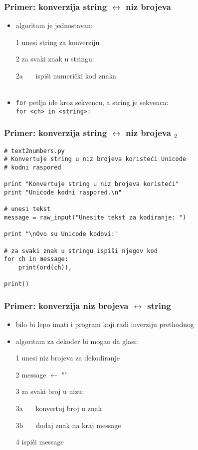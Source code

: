 \documentclass[utf8,compress]{beamer}
\begin{document}
\begin{frame}[fragile]
  \frametitle{Primer: konverzija string $\leftrightarrow$ niz brojeva}
  \begin{itemize}
    \item algoritam je jednostavan:
    \item[1] unesi string za konverziju
    \item[2] za svaki znak u stringu:
    \item[2a] \ \ \ ispiši numerički kod znaka \\ \ \\ %
    \item \texttt{for} petlja ide kroz sekvencu, a string je sekvenca: \\
      \texttt{for <ch> in <string>:}
  \end{itemize}
\end{frame}

\begin{frame}[fragile,shrink=10]
  \frametitle{Primer: konverzija string $\leftrightarrow$ niz brojeva $_2$}
\begin{verbatim}
# text2numbers.py
# Konvertuje string u niz brojeva koristeći Unicode
# kodni raspored

print "Konvertuje string u niz brojeva koristeći"
print "Unicode kodni raspored.\n"

# unesi tekst
message = raw_input("Unesite tekst za kodiranje: ")

print "\nOvo su Unicode kodovi:"

# za svaki znak u stringu ispiši njegov kod
for ch in message:
    print(ord(ch)),

print()
\end{verbatim}
\end{frame}

\begin{frame}[fragile]
  \frametitle{Primer: konverzija niz brojeva $\leftrightarrow$ string}
  \begin{itemize}
    \item bilo bi lepo imati i program koji radi inverziju prethodnog
    \item algoritam za dekoder bi mogao da glasi:
    \item[1] unesi niz brojeva za dekodiranje
    \item[2] message $\leftarrow$ ""
    \item[3] za svaki broj u nizu:
    \item[3a] \ \ \ konvertuj broj u znak
    \item[3b] \ \ \ dodaj znak na kraj message
    \item[4] ispiši message
  \end{itemize}
\end{frame}
\end{document}
